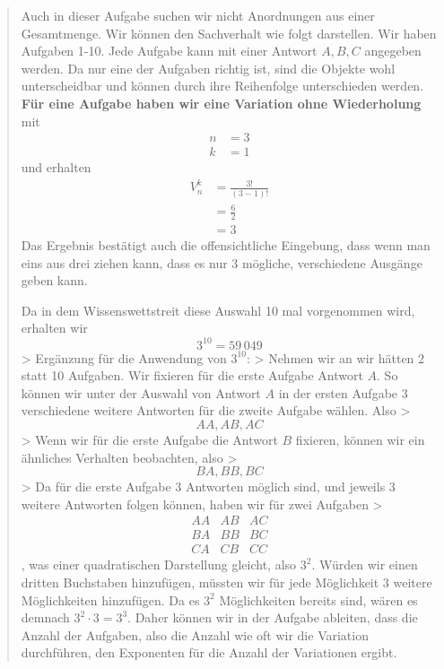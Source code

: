 \documentclass[
]{article}
\begin{document}
\begin{quote}
Auch in dieser Aufgabe suchen wir nicht Anordnungen aus einer
Gesamtmenge. Wir können den Sachverhalt wie folgt darstellen. Wir haben
Aufgaben 1-10. Jede Aufgabe kann mit einer Antwort \(A,B,C\) angegeben
werden. Da nur eine der Aufgaben richtig ist, sind die Objekte wohl
unterscheidbar und können durch ihre Reihenfolge unterschieden werden.
\textbf{Für eine Aufgabe haben wir eine Variation ohne Wiederholung} mit
\[\begin{align}
n&=3 \\
k&=1
\end{align}\] und erhalten \[\begin{align}
V^k_{n}&=\frac{3!}{(3-1)!} \\
&= \frac{6}{2} \\
&= 3
\end{align}\] Das Ergebnis bestätigt auch die offensichtliche Eingebung,
dass wenn man eins aus drei ziehen kann, dass es nur 3 mögliche,
verschiedene Ausgänge geben kann.

Da in dem Wissenswettstreit diese Auswahl 10 mal vorgenommen wird,
erhalten wir \[3^{10}= 59\,049\] \textgreater{} Ergänzung für die
Anwendung von \(3^{10}\): \textgreater{} Nehmen wir an wir hätten 2
statt 10 Aufgaben. Wir fixieren für die erste Aufgabe Antwort \(A\). So
können wir unter der Auswahl von Antwort \(A\) in der ersten Aufgabe 3
verschiedene weitere Antworten für die zweite Aufgabe wählen. Also
\textgreater{} \[AA, AB, AC\] \textgreater{} Wenn wir für die erste
Aufgabe die Antwort \(B\) fixieren, können wir ein ähnliches Verhalten
beobachten, also \textgreater{} \[BA, BB, BC\] \textgreater{} Da für die
erste Aufgabe 3 Antworten möglich sind, und jeweils 3 weitere Antworten
folgen können, haben wir für zwei Aufgaben \textgreater{}
\[\begin{matrix}
AA & AB & AC \\
BA &BB & BC \\
CA & CB & CC
\end{matrix}\] , was einer quadratischen Darstellung gleicht, also
\(3^2\). Würden wir einen dritten Buchstaben hinzufügen, müssten wir für
jede Möglichkeit 3 weitere Möglichkeiten hinzufügen. Da es \(3^2\)
Möglichkeiten bereits sind, wären es demnach \(3^2 \cdot 3 = 3^3\).
Daher können wir in der Aufgabe ableiten, dass die Anzahl der Aufgaben,
also die Anzahl wie oft wir die Variation durchführen, den Exponenten
für die Anzahl der Variationen ergibt.
\end{quote}
\end{document}
